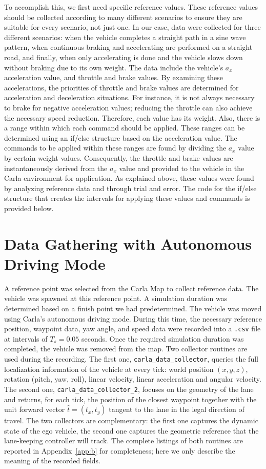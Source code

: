 To accomplish this, we first need specific reference values. These reference values should be collected according to many different scenarios to ensure they are suitable for every scenario, not just one. In our case, data were collected for three different scenarios: when the vehicle completes a straight path in a sine wave pattern, when continuous braking and accelerating are performed on a straight road, and finally, when only accelerating is done and the vehicle slows down without braking due to its own weight. The data include the vehicle's $a_x$ acceleration value, and throttle and brake values. By examining these accelerations, the priorities of throttle and brake values are determined for acceleration and deceleration situations. For instance, it is not always necessary to brake for negative acceleration values; reducing the throttle can also achieve the necessary speed reduction. Therefore, each value has its weight. Also, there is a range within which each command should be applied. These ranges can be determined using an if/else structure based on the acceleration value. The commands to be applied within these ranges are found by dividing the $a_x$ value by certain weight values. Consequently, the throttle and brake values are instantaneously derived from the $a_x$ value and provided to the vehicle in the Carla environment for application. As explained above, these values were found by analyzing reference data and through trial and error. The code for the if/else structure that creates the intervals for applying these values and commands is provided below.

\section{Data Gathering with Autonomous Driving Mode}
A reference point was selected from the Carla Map to collect reference data. The vehicle was spawned at this reference point. A simulation duration was determined based on a finish point we had predetermined. The vehicle was moved using Carla's autonomous driving mode. During this time, the necessary reference position, waypoint data, yaw angle, and speed data were recorded into a \texttt{.csv} file at intervals of $T_s = 0.05$ seconds. Once the required simulation duration was completed, the vehicle was removed from the map.
\hyphenation{}
Two collector routines are used during the recording. The first one, \texttt{carla\_data\_collector}, queries the full localization information of the vehicle at every tick: world position $(x, y, z)$, rotation (pitch, yaw, roll), linear velocity, linear acceleration and angular velocity. The second one, \texttt{carla\_data\_collector\_2}, focuses on the geometry of the lane and returns, for each tick, the position of the closest waypoint together with the unit forward vector $\hat{t} = (t_x, t_y)$ tangent to the lane in the legal direction of travel. The two collectors are complementary: the first one captures the dynamic state of the ego vehicle, the second one captures the geometric reference that the lane-keeping controller will track. The complete listings of both routines are reported in Appendix~\ref{app:b} for completeness; here we only describe the meaning of the recorded fields.

